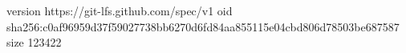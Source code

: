 version https://git-lfs.github.com/spec/v1
oid sha256:c0af96959d37f59027738bb6270d6fd84aa855115e04cbd806d78503be687587
size 123422
